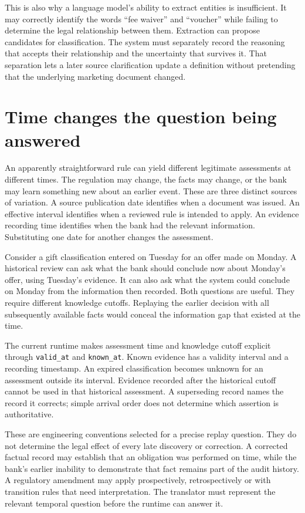 This is also why a language model's ability to extract entities is insufficient.
It may correctly identify the words ``fee waiver'' and ``voucher'' while failing
to determine the legal relationship between them. Extraction can propose
candidates for classification. The system must separately record the reasoning
that accepts their relationship and the uncertainty that survives it. That
separation lets a later source clarification update a definition without
pretending that the underlying marketing document changed.

\section{Time changes the question being answered}
\label{merge:M01:06}

\label{sec:problem-time}
An apparently straightforward rule can yield different legitimate assessments
at different times. The regulation may change, the facts may change, or the
bank may learn something new about an earlier event. These are three distinct
sources of variation. A source publication date identifies when a document was
issued. An effective interval identifies when a reviewed rule is intended to
apply. An evidence recording time identifies when the bank had the relevant
information. Substituting one date for another changes the assessment.

Consider a gift classification entered on Tuesday for an offer made on Monday.
A historical review can ask what the bank should conclude now about Monday's
offer, using Tuesday's evidence. It can also ask what the system could conclude
on Monday from the information then recorded. Both questions are useful. They
require different knowledge cutoffs. Replaying the earlier decision with all
subsequently available facts would conceal the information gap that existed at
the time.

The current runtime makes assessment time and knowledge cutoff explicit through
\texttt{valid\_at} and \texttt{known\_at}. Known evidence has a validity interval
and a recording timestamp. An expired classification becomes unknown for an
assessment outside its interval. Evidence recorded after the historical cutoff
cannot be used in that historical assessment. A superseding record names the
record it corrects; simple arrival order does not determine which assertion is
authoritative.

These are engineering conventions selected for a precise replay question. They
do not determine the legal effect of every late discovery or correction. A
corrected factual record may establish that an obligation was performed on time,
while the bank's earlier inability to demonstrate that fact remains part of the
audit history. A regulatory amendment may apply prospectively, retrospectively or
with transition rules that need interpretation. The translator must represent
the relevant temporal question before the runtime can answer it.

